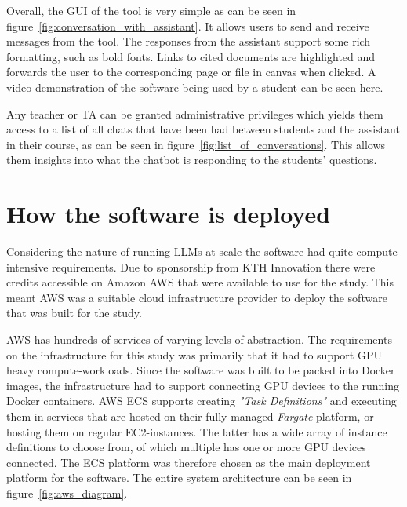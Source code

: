 


Overall, the \gls{GUI} of the tool is very simple as can be seen in figure~\ref{fig:conversation_with_assistant}. It allows users to send and receive messages from the tool. The responses from the assistant support some rich formatting, such as bold fonts. Links to cited documents are highlighted and forwards the user to the corresponding page or file in canvas when clicked. A video demonstration of the software being used by a student \href{https://www.youtube.com/watch?v=spdZ4jwI8mo}{can be seen here}.


Any teacher or TA can be granted administrative privileges which yields them access to a list of all chats that have been had between students and the assistant in their course, as can be seen in figure~\ref{fig:list_of_conversations}. This allows them insights into what the chatbot is responding to the students' questions.








\section{How the software is deployed}


Considering the nature of running \gls{LLM}s at scale the software had quite compute-intensive requirements. Due to sponsorship from KTH Innovation there were credits accessible on Amazon AWS that were available to use for the study. This meant AWS was a suitable cloud infrastructure provider to deploy the software that was built for the study.


AWS has hundreds of services of varying levels of abstraction. The requirements on the infrastructure for this study was primarily that it had to support GPU heavy compute-workloads. Since the software was built to be packed into Docker images, the infrastructure had to support connecting GPU devices to the running Docker containers. AWS \gls{ECS} supports creating \textit{"Task Definitions"} and executing them in services that are hosted on their fully managed \textit{Fargate} platform, or hosting them on regular \gls{EC2}-instances. The latter has a wide array of instance definitions to choose from, of which multiple has one or more GPU devices connected. The \gls{ECS} platform was therefore chosen as the main deployment platform for the software. The entire system architecture can be seen in figure~\ref{fig:aws_diagram}.


